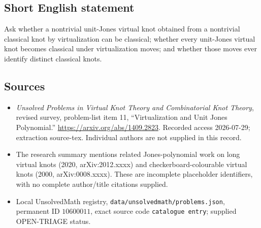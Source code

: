 \documentclass[11pt]{article}
\begin{document}
\subsection{Short English statement}
Ask whether a nontrivial unit-Jones virtual knot obtained from a nontrivial classical knot by virtualization can be classical; whether every unit-Jones virtual knot becomes classical under virtualization moves; and whether those moves ever identify distinct classical knots.
\subsection{Sources}
\begin{itemize}
\item \emph{Unsolved Problems in Virtual Knot Theory and Combinatorial Knot Theory}, revised survey, problem-list item 11, ``Virtualization and Unit Jones Polynomial.'' \url{https://arxiv.org/abs/1409.2823}. Recorded access 2026-07-29; extraction source-tex. Individual authors are not supplied in this record.
\item The research summary mentions related Jones-polynomial work on long virtual knots (2020, arXiv:2012.xxxx) and checkerboard-colourable virtual knots (2000, arXiv:0008.xxxx). These are incomplete placeholder identifiers, with no complete author/title citations supplied.
\item Local UnsolvedMath registry, \texttt{data/unsolvedmath/problems.json}, permanent ID \(10600011\), exact source code \texttt{catalogue entry}; supplied OPEN-TRIAGE status.
\end{itemize}
\end{document}
